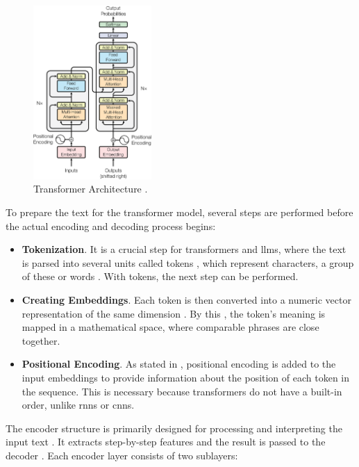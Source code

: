 \begin{figure}[htbp]
  \centering
   \includegraphics[width=0.4\textwidth]{../extra/transformer.png}
   \caption[Transformer Architecture.]{Transformer Architecture \cite{vaswani_attention_2017}.} 
   \label{fig:transformer-architecture}
\end{figure}

 To prepare the text for the transformer model, several steps are performed before the actual encoding and decoding process begins:

\begin{itemize}
   \item \textbf{Tokenization}. It is a crucial step for transformers and \ac{llms}, where the text is parsed into several units called tokens \cite{naveed_comprehensive_2024,raiaan_review_2024,zhao_survey_2025}, which represent characters, a group of these or words \cite{naik_large_2024}. With tokens, the next step can be performed.
   \item \textbf{Creating Embeddings}. Each token is then converted into a numeric vector representation of the same dimension \cite{vaswani_attention_2017}. By this \cite{raiaan_review_2024}, the token's meaning is mapped in a mathematical space, where comparable phrases are close together. 
   \item \textbf{Positional Encoding}. As stated in \cite{vaswani_attention_2017}, positional encoding is added to the input embeddings to provide information about the position of each token in the sequence. This is necessary because transformers do not have a built-in order, unlike \ac{rnns} or \ac{cnns}. 
\end{itemize}

 The encoder structure is primarily designed for processing and interpreting the input text \cite{wang_history_2024}. It extracts step-by-step features and the result is passed to the decoder \cite{liu_understanding_2024}. Each encoder layer consists of two sublayers: 

